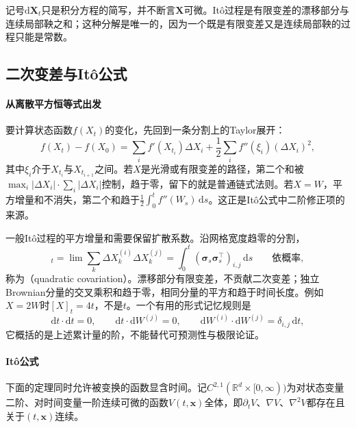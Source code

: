 记号$\mathrm d\bm X_t$只是积分方程的简写，并不断言$\bm X$可微。Itô过程是有限变差的漂移部分与连续局部鞅之和；这种分解是唯一的，因为一个既是有限变差又是连续局部鞅的过程只能是常数。

\subsection{二次变差与Itô公式}
\label{sec:ctsp-ito-formula}

\paragraph{从离散平方恒等式出发}
要计算状态函数$f(X_t)$的变化，先回到一条分割上的Taylor展开：
\[
  f(X_t)-f(X_0)=\sum_if'(X_{t_i})\Delta X_i+\frac12\sum_if''(\xi_i)(\Delta X_i)^2 ,
\]
其中$\xi_i$介于$X_{t_i}$与$X_{t_{i+1}}$之间。若$X$是光滑或有限变差的路径，第二个和被$\max_i|\Delta X_i|\cdot\sum_i|\Delta X_i|$控制，趋于零，留下的就是普通链式法则。若$X=W$，平方增量和不消失，第二个和趋于$\frac12\int_0^tf''(W_s)\,\mathrm ds$。这正是Itô公式中二阶修正项的来源。

一般Itô过程的平方增量和需要保留扩散系数。沿网格宽度趋零的分割，
\begin{equation}
  [X^{(i)},X^{(j)}]_t=\lim\sum_k\Delta X^{(i)}_k\Delta X^{(j)}_k=\int_0^t(\bm\sigma_s\bm\sigma_s^\top)_{i,j}\,\mathrm ds\qquad\text{依概率},
  \label{eq:ctsp-ito-covariation}
\end{equation}
称为（quadratic covariation）。漂移部分有限变差，不贡献二次变差；独立Brownian分量的交叉乘积和趋于零，相同分量的平方和趋于时间长度。例如$X=2W$时$[X]_t=4t$，不是$t$。一个有用的形式记忆规则是
\[
  \mathrm dt\cdot\mathrm dt=0,\qquad\mathrm dt\cdot\mathrm dW^{(j)}=0,\qquad\mathrm dW^{(i)}\cdot\mathrm dW^{(j)}=\delta_{i,j}\,\mathrm dt,
\]
它概括的是上述累计量的阶，不能替代可预测性与极限论证。

\paragraph{Itô公式}
下面的定理同时允许被变换的函数显含时间。记$C^{2,1}(\mathbb R^d\times[0,\infty))$为对状态变量二阶、对时间变量一阶连续可微的函数$V(t,\bm x)$全体，即$\partial_tV$、$\nabla V$、$\nabla^2V$都存在且关于$(t,\bm x)$连续。

